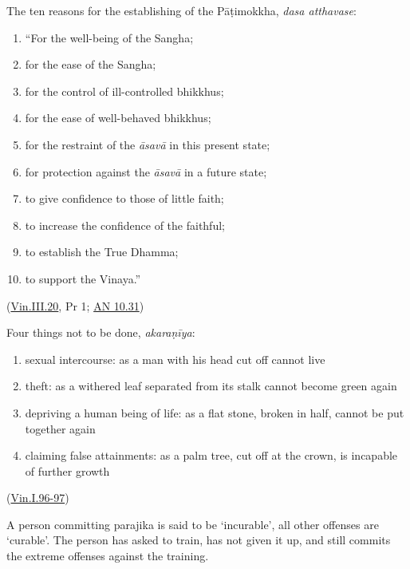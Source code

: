 \begin{multicols}{2}

The ten reasons for the establishing of the Pāṭimokkha, \emph{dasa
atthavase}:

\begin{enumerate}
\def\labelenumi{\arabic{enumi}.}
\tightlist
\item
  ``For the well-being of the Sangha;
\item
  for the ease of the Sangha;
\item
  for the control of ill-controlled bhikkhus;
\item
  for the ease of well-behaved bhikkhus;
\item
  for the restraint of the \emph{āsavā} in this present state;
\item
  for protection against the \emph{āsavā} in a future state;
\item
  to give confidence to those of little faith;
\item
  to increase the confidence of the faithful;
\item
  to establish the True Dhamma;
\item
  to support the Vinaya.''
\end{enumerate}

(\href{https://suttacentral.net/pli-tv-bu-vb-pj1/en/brahmali}{Vin.III.20},
Pr 1; \href{https://suttacentral.net/an10.31/en/bodhi}{AN 10.31})

\columnbreak

Four things not to be done, \emph{akaraṇīya}:

\begin{enumerate}
\def\labelenumi{\arabic{enumi}.}
\tightlist
\item
  sexual intercourse: as a man with his head cut off cannot live
\item
  theft: as a withered leaf separated from its stalk cannot become green
  again
\item
  depriving a human being of life: as a flat stone, broken in half,
  cannot be put together again
\item
  claiming false attainments: as a palm tree, cut off at the crown, is
  incapable of further growth
\end{enumerate}

(\href{https://suttacentral.net/pli-tv-kd1/en/horner-brahmali}{Vin.I.96-97})

A person committing parajika is said to be `incurable', all other
offenses are `curable'. The person has asked to train, has not given it
up, and still commits the extreme offenses against the training.

\end{multicols}
\par
\clearpage

